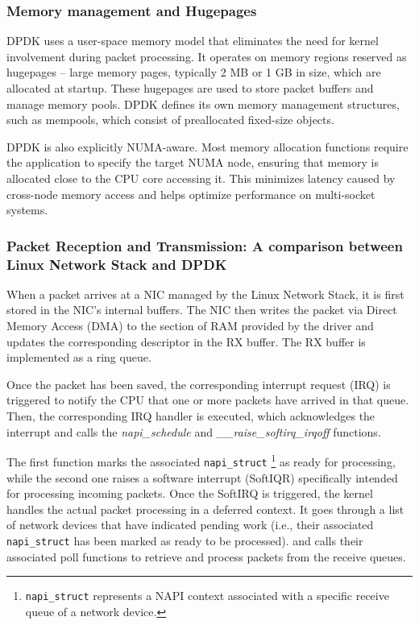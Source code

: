 \subsubsection{Memory management and Hugepages}
DPDK uses a user-space memory model that eliminates the need for kernel involvement during packet processing. 
It operates on memory regions reserved as hugepages -- large memory pages, typically 2 MB or 1 GB in size, which are allocated at startup. 
These hugepages are used to store packet buffers and manage memory pools. 
DPDK defines its own memory management structures, such as mempools, which consist of preallocated fixed-size objects. 

DPDK is also explicitly NUMA-aware. Most memory allocation functions require the application to specify the target NUMA node, ensuring that memory is allocated close to the CPU core accessing it. 
This minimizes latency caused by cross-node memory access and helps optimize performance on multi-socket systems.~\cite{burakov2019memory}

\subsubsection{Packet Reception and Transmission: A comparison between Linux Network Stack and DPDK}
When a packet arrives at a NIC managed by the Linux Network Stack, it is first stored in the NIC’s internal buffers. 
The NIC then writes the packet via Direct Memory Access (DMA) to the section of RAM provided by the driver and updates the corresponding descriptor in the RX buffer. 
The RX buffer is implemented as a ring queue.

Once the packet has been saved, the corresponding interrupt request (IRQ) is triggered to notify the CPU that one or more packets have arrived in that queue. 
Then, the corresponding IRQ handler is executed, which acknowledges the interrupt and calls the \textit{napi\_schedule} and \textit{\_\_raise\_softirq\_irqoff} functions.

The first function marks the associated \texttt{napi\_struct}%
\footnote{\texttt{napi\_struct} represents a NAPI context associated with a specific receive queue of a network device.}
 as ready for processing, while the second one raises a software interrupt (SoftIQR) specifically intended for processing incoming packets. 
Once the SoftIRQ is triggered, the kernel handles the actual packet processing in a deferred context. 
It goes through a list of network devices that have indicated pending work (i.e., their associated \texttt{napi\_struct} has been marked as ready to be processed).
and calls their associated poll functions to retrieve and process packets from the receive queues.

